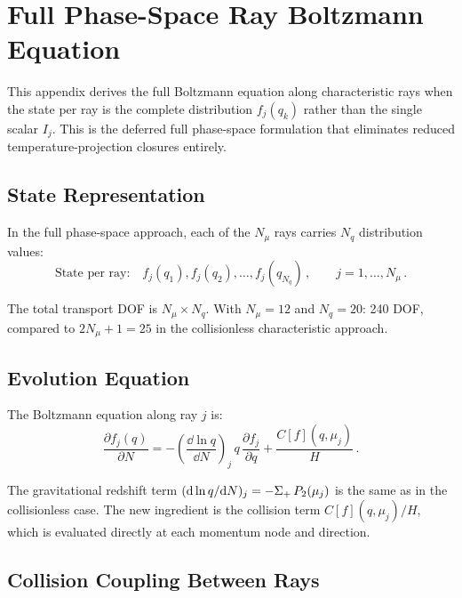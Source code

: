 \section{Full Phase-Space Ray Boltzmann Equation}\label{app:full_ray}

This appendix derives the full Boltzmann equation along characteristic rays when the state per ray is the complete distribution $f_j(q_k)$ rather than the single scalar $I_j$.  This is the deferred full phase-space formulation that eliminates reduced temperature-projection closures entirely.

\subsection{State Representation}

In the full phase-space approach, each of the $N_\mu$ rays carries $N_q$ distribution values:
\begin{equation}
\text{State per ray:}\quad f_j(q_1), f_j(q_2), \ldots, f_j(q_{N_q})\,,\qquad j = 1, \ldots, N_\mu\,.
\end{equation}

The total transport DOF is $N_\mu \times N_q$.  With $N_\mu = 12$ and $N_q = 20$: 240 DOF, compared to $2N_\mu + 1 = 25$ in the collisionless characteristic approach.

\subsection{Evolution Equation}

The Boltzmann equation along ray $j$ is:
\begin{equation}
\frac{\partial f_j(q)}{\partial N} = -\left(\frac{\dd\ln q}{\dd N}\right)_{\!j}\,q\,\frac{\partial f_j}{\partial q} + \frac{C[f](q, \mu_j)}{H}\,.\label{eq:full_ray_boltzmann}
\end{equation}

The gravitational redshift term $(\mathrm{d}\ln q/\mathrm{d} N)_j = -\Sigma_+\,P_2(\mu_j)$ is the same as in the collisionless case.  The new ingredient is the collision term $C[f](q, \mu_j)/H$, which is evaluated directly at each momentum node and direction.

\subsection{Collision Coupling Between Rays}

